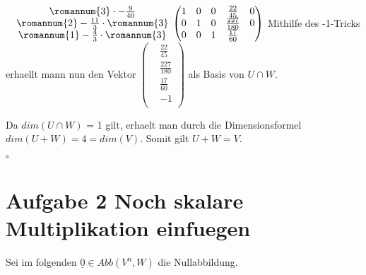 \documentclass{article}
\begin{document}
\begin{math}
                \newline
                \newline
                \newline
                \begin{matrix}
                  & \romannum{3} \cdot - \frac{9}{40} \\
                  & \romannum{2} - \frac{11}{3} \cdot \romannum{3} \\
                  & \romannum{1} - \frac{4}{3} \cdot \romannum{3} \\
                  \end{matrix}
                  \;
                  \begin{pmatrix}
                    1 & 0 & 0 & \frac{22}{45} & 0 \\
                    0 & 1 & 0 & \frac{227}{180} & 0 \\
                    0 & 0 & 1 & \frac{17}{60} \\
                    \end{pmatrix}
                  \end{math}
                  Mithilfe des -1-Tricks erhaellt mann nun den Vektor
                  \begin{math}
                    \begin{pmatrix}
                      & \frac{22}{45} \\
                      & \frac{227}{180} \\
                      & \frac{17}{60} \\
                      & -1 \\
                      \end{pmatrix}
                    \end{math}
                    als Basis von $U \cap W$.

                    Da $dim(U \cap W)$ = 1 gilt, erhaelt man durch die Dimensionsformel $dim( U + W) = 4 = dim(V)$. Somit gilt $U + W = V$.

                     \hfill $\square$
  \section{Aufgabe 2 Noch skalare Multiplikation einfuegen}
  Sei im folgenden $\underline{0} \in Abb(V^{n},W)$ die Nullabbildung.
\end{document}
